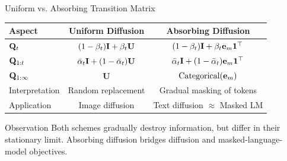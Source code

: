 \documentclass{beamer}
\renewcommand{\eqpause}{}
\begin{document}
\begin{frame}{Uniform vs. Absorbing Transition Matrix}
	\begin{table}[h!]
		\centering
		\small
		\begin{tabular}{lcc}
			\toprule
			\textbf{Aspect} & \textbf{Uniform Diffusion} & \textbf{Absorbing Diffusion} \\
			\midrule
			$\mathbf{Q}_t$
				& $(1-\beta_t)\mathbf{I} + \beta_t \mathbf{U}$ 
				& $(1-\beta_t)\mathbf{I} + \beta_t \mathbf{e}_m\mathbf{1}^\top$ \\[4pt]
			$\mathbf{Q}_{1:t}$
				& $\bar\alpha_t \mathbf{I} + (1-\bar\alpha_t)\mathbf{U}$
				& $\bar\alpha_t \mathbf{I} + (1-\bar\alpha_t)\mathbf{e}_m\mathbf{1}^\top$ \\[4pt]
			$\mathbf{Q}_{1:\infty}$
				& $\mathbf{U}$
				& $\mathrm{Categorical}(\mathbf{e}_m)$ \\[4pt]
			Interpretation
				& Random replacement
				& Gradual masking of tokens \\[4pt]
			Application
				& Image diffusion
				& Text diffusion $\approx$ Masked LM \\[4pt]
			\bottomrule
		\end{tabular}
	\end{table}
	\eqpause
	\begin{block}{Observation}
		Both schemes gradually destroy information, but differ in their stationary limit.
		Absorbing diffusion bridges diffusion and masked-language-model objectives.
	\end{block}
\end{frame}
\end{document}
